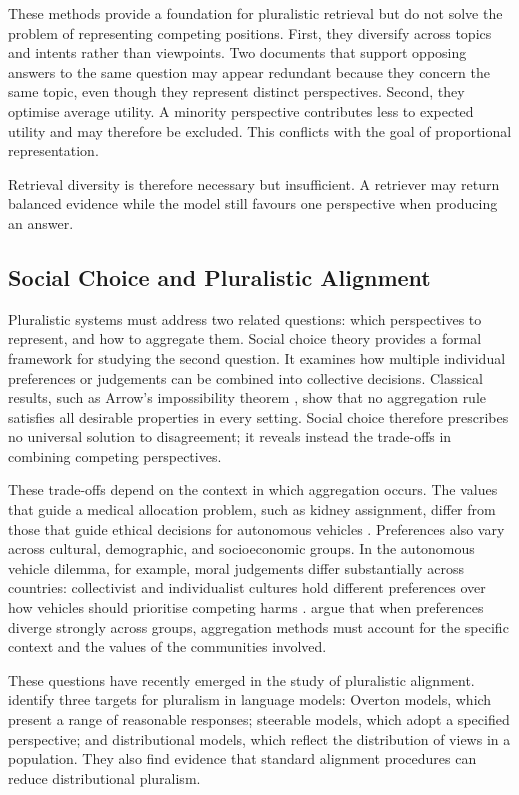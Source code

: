 These methods provide a foundation for pluralistic retrieval but do not solve the problem of representing competing positions. First, they diversify across topics and intents rather than viewpoints. Two documents that support opposing answers to the same question may appear redundant because they concern the same topic, even though they represent distinct perspectives. Second, they optimise average utility. A minority perspective contributes less to expected utility and may therefore be excluded. This conflicts with the goal of proportional representation.

Retrieval diversity is therefore necessary but insufficient. A retriever may return balanced evidence while the model still favours one perspective when producing an answer.

\subsection{Social Choice and Pluralistic Alignment}

Pluralistic systems must address two related questions: which perspectives to represent, and how to aggregate them. Social choice theory provides a formal framework for studying the second question. It examines how multiple individual preferences or judgements can be combined into collective decisions. Classical results, such as Arrow's impossibility theorem \citep{arrow1951socialchoice}, show that no aggregation rule satisfies all desirable properties in every setting. Social choice therefore prescribes no universal solution to disagreement; it reveals instead the trade-offs in combining competing perspectives.

These trade-offs depend on the context in which aggregation occurs. The values that guide a medical allocation problem, such as kidney assignment, differ from those that guide ethical decisions for autonomous vehicles \citep{freedman2020akidneyallocation,noothigattu2018voting}. Preferences also vary across cultural, demographic, and socioeconomic groups. In the autonomous vehicle dilemma, for example, moral judgements differ substantially across countries: collectivist and individualist cultures hold different preferences over how vehicles should prioritise competing harms \citep{awad2018moral}. \citet{pmlr-v235-conitzer24a} argue that when preferences diverge strongly across groups, aggregation methods must account for the specific context and the values of the communities involved.

These questions have recently emerged in the study of pluralistic alignment. \citet{pmlr-v235-sorensen24a} identify three targets for pluralism in language models: Overton models, which present a range of reasonable responses; steerable models, which adopt a specified perspective; and distributional models, which reflect the distribution of views in a population. They also find evidence that standard alignment procedures can reduce distributional pluralism.

